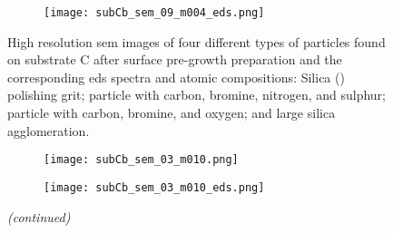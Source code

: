 \begin{figure}
\begin{subfigure}[t]{\textwidth}
\begin{minipage}[t]{0.43\linewidth}
            \centering
            \texttt{[image: subCb\_sem\_09\_m004\_eds.png]}
          \end{minipage}
          \begin{minipage}[t]{0.11\linewidth}
            \centering
            \atomicTable[&][&][&]
          \end{minipage}
        \caption{}\label{fig:subCb_Br-etch2}
    \end{subfigure}
    \caption[\Ac{sem} images, \ac{eds} spectra, and \ac{eds} atomic compositions of four different types of particles found on substrate C after surface pre-growth preparation.]{High resolution \acf{sem} images of four different types of particles found on substrate C after surface pre-growth preparation and the corresponding \acf{eds} spectra and atomic compositions:  Silica () polishing grit;  particle with carbon, bromine, nitrogen, and sulphur;  particle with carbon, bromine, and oxygen; and  large silica agglomeration.}\label{fig:subCb_sem_w_eds}
\end{figure}
%
\begin{figure}[htbp]
\ContinuedFloat
    \centering
    \begin{subfigure}[t]{\textwidth}
          \begin{minipage}[t]{0.43\linewidth}
            \centering
            \texttt{[image: subCb\_sem\_03\_m010.png]}
          \end{minipage}
          \hfill
          \begin{minipage}[t]{0.43\linewidth}
            \centering
            \texttt{[image: subCb\_sem\_03\_m010\_eds.png]}
          \end{minipage}
          \begin{minipage}[t]{0.11\linewidth}
            \centering
            \atomicTable[&][&][&]
          \end{minipage}
        \caption{}\label{fig:subCb_silica_large}
    \end{subfigure}
    \captionsetup{list=no}
    \caption{\emph{(continued)}}
\end{figure}

